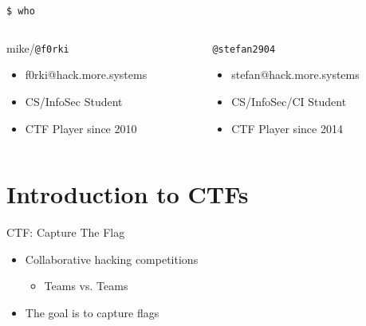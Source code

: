 {
\begin{frame}[t,plain]
    \titlepage
\end{frame}
}

\begin{frame}
  {\texttt{\$ who}}

  \begin{columns}
    \begin{column}{0.48\textwidth}
      {mike/\texttt{@f0rki}}
      \begin{itemize}
        \item f0rki@hack.more.systems
        \item CS/InfoSec Student
        \item CTF Player since 2010
      \end{itemize}
    \end{column}

    \begin{column}{0.48\textwidth}
      \texttt{@stefan2904}
      \begin{itemize}
        \item stefan@hack.more.systems
        \item CS/InfoSec/CI Student
        \item CTF Player since 2014
      \end{itemize}
    \end{column}
  \end{columns}

\end{frame}




\section{Introduction to CTFs}

\begin{frame}[fragile]
  {CTF: Capture The Flag}

  \begin{itemize}
    \item Collaborative hacking competitions
    \begin{itemize}
    	\item Teams vs. Teams
    \end{itemize}
    \item The goal is to capture flags
  \end{itemize}
\end{frame}

